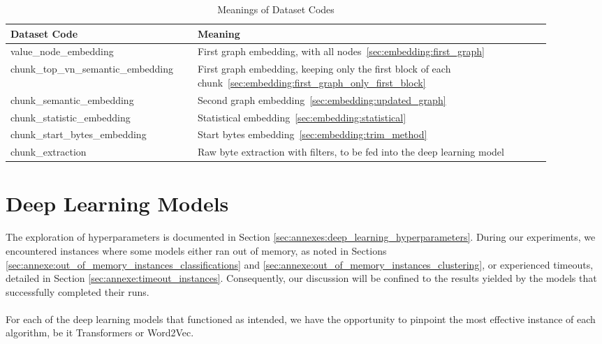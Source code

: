 \begin{table}[ht]
    \centering
    \begin{tabular}{|p{0.3\linewidth}|p{0.6\linewidth}|}
    \hline
    Dataset Code & Meaning \\ 
    \hline
    value\_node\_embedding & First graph embedding, with all nodes~\ref{sec:embedding:first_graph} \\ \hline
    chunk\_top\_vn\_semantic\_embedding & First graph embedding, keeping only the first block of each chunk~\ref{sec:embedding:first_graph_only_first_block} \\ \hline
    chunk\_semantic\_embedding & Second graph embedding~\ref{sec:embedding:updated_graph} \\ \hline
    chunk\_statistic\_embedding & Statistical embedding~\ref{sec:embedding:statistical} \\ \hline
    chunk\_start\_bytes\_embedding & Start bytes embedding~\ref{sec:embedding:trim_method} \\ \hline
    chunk\_extraction & Raw byte extraction with filters, to be fed into the deep learning model\\ \hline
    \end{tabular}
    \caption{Meanings of Dataset Codes}
    \label{tab:results:dataset_codes}
\end{table}


\section{Deep Learning Models}

\paragraph{}The exploration of hyperparameters is documented in Section \ref{sec:annexes:deep_learning_hyperparameters}. During our experiments, we encountered instances where some models either ran out of memory, as noted in Sections \ref{sec:annexe:out_of_memory_instances_classifications} and \ref{sec:annexe:out_of_memory_instances_clustering}, or experienced timeouts, detailed in Section \ref{sec:annexe:timeout_instances}. Consequently, our discussion will be confined to the results yielded by the models that successfully completed their runs.

\paragraph{}For each of the deep learning models that functioned as intended, we have the opportunity to pinpoint the most effective instance of each algorithm, be it Transformers or Word2Vec.

